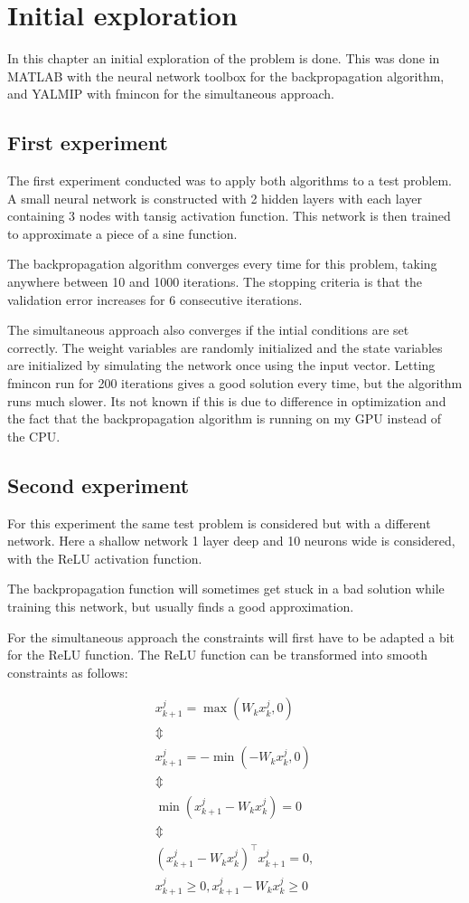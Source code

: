 \chapter{Initial exploration}
\label{cha:1}
In this chapter an initial exploration of the problem is done. This was done in MATLAB with the neural network toolbox for the backpropagation algorithm, and YALMIP with fmincon for the simultaneous approach.

\section{First experiment}
The first experiment conducted was to apply both algorithms to a test problem. A small neural network is constructed with 2 hidden layers with each layer containing 3 nodes with tansig activation function. This network is then trained to approximate a piece of a sine function. 

The backpropagation algorithm converges every time for this problem, taking anywhere between 10 and 1000 iterations. The stopping criteria is that the validation error increases for 6 consecutive iterations.

The simultaneous approach also converges if the intial conditions are set correctly. The weight variables are randomly initialized and the state variables are initialized by simulating the network once using the input vector. Letting fmincon run for 200 iterations gives a good solution every time, but the algorithm runs much slower. Its not known if this is due to difference in optimization and the fact that the backpropagation algorithm is running on my GPU instead of the CPU.

\section{Second experiment}
For this experiment the same test problem is considered but with a different network. Here a shallow network 1 layer deep and 10 neurons wide is considered, with the ReLU activation function.

The backpropagation function will sometimes get stuck in a bad solution while training this network, but usually finds a good approximation.

For the simultaneous approach the constraints will first have to be adapted a bit for the ReLU function. The ReLU function can be transformed into smooth constraints as follows:

   \begin{gather*}
   x_{k+1}^j = \max(W_kx_k^j,0) \\
   \Updownarrow \\
   x_{k+1}^j = -\min(-W_kx_k^j,0) \\
   \Updownarrow \\
   \min(x_{k+1}^j-W_kx_k^j) = 0 \\
   \Updownarrow \\
   (x_{k+1}^j-W_kx_k^j)^\top x_{k+1}^j = 0,\\
   x_{k+1}^j\geq 0,x_{k+1}^j-W_kx_k^j\geq 0
   \end{gather*}
   
